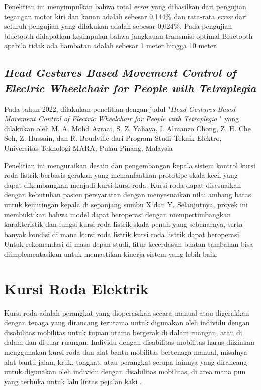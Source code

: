 Penelitian ini menyimpulkan bahwa total \emph{error} yang dihasilkan dari pengujian tegangan motor kiri dan kanan adalah sebesar 0,144\% dan rata-rata \emph{error} dari seluruh pengujian yang dilakukan adalah sebesar 0,024\%. Pada pengujian bluetooth didapatkan kesimpulan bahwa jangkauan transmisi optimal Bluetooth apabila tidak ada hambatan adalah sebesar 1 meter hingga 10 meter.

\subsection{\textit{Head Gestures Based Movement Control of Electric Wheelchair for People with Tetraplegia }}

Pada tahun 2022, dilakukan penelitian dengan judul "\textit{Head Gestures Based Movement Control of Electric Wheelchair for People with Tetraplegia }" yang dilakukan oleh M. A. Mohd Azraai, S. Z. Yahaya, I. Almanzo Chong, Z. H. Che Soh, Z. Hussain, dan R. Boudville dari Program Studi Teknik Elektro, Universitas Teknologi MARA, Pulau Pinang, Malaysia \parencite{9935646}

Penelitian ini menguraikan desain dan pengembangan kepala sistem kontrol kursi roda listrik berbasis gerakan yang memanfaatkan prototipe skala kecil yang dapat dikembangkan menjadi kursi 
kursi roda. Kursi roda dapat disesuaikan dengan kebutuhan pasien persyaratan dengan menyesuaikan nilai ambang batas untuk kemiringan kepala di sepanjang sumbu X dan Y. Selanjutnya, proyek ini membuktikan bahwa model dapat beroperasi dengan mempertimbangkan karakteristik dan fungsi kursi roda listrik skala penuh yang sebenarnya, serta banyak kondisi di mana kursi roda listrik kursi roda listrik dapat beroperasi. Untuk rekomendasi di masa depan studi, fitur kecerdasan buatan tambahan bisa diimplementasikan untuk memastikan kinerja sistem yang lebih baik.

\section{Kursi Roda Elektrik}
\label{subsec:kursirodaelektrik}

Kursi roda adalah perangkat yang dioperasikan secara manual atau digerakkan dengan tenaga yang dirancang terutama untuk digunakan oleh individu dengan disabilitas mobilitas untuk tujuan utama bergerak di dalam ruangan, atau di dalam dan di luar ruangan.  Individu dengan disabilitas mobilitas harus diizinkan menggunakan kursi roda dan alat bantu mobilitas bertenaga manual, misalnya alat bantu jalan, kruk, tongkat, atau perangkat serupa lainnya yang dirancang untuk digunakan oleh individu dengan disabilitas mobilitas, di area mana pun yang terbuka untuk lalu lintas pejalan kaki \parencite{ADA_2023}.

